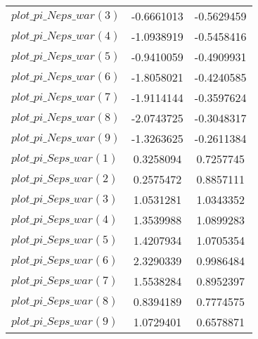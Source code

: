 \begin{center}
\begin{longtable}{lcc}
$plot\_pi\_N eps\_war (3)   $	 & 	     -0.6661013	 & 	     -0.5629459 \\ 
$plot\_pi\_N eps\_war (4)   $	 & 	     -1.0938919	 & 	     -0.5458416 \\ 
$plot\_pi\_N eps\_war (5)   $	 & 	     -0.9410059	 & 	     -0.4909931 \\ 
$plot\_pi\_N eps\_war (6)   $	 & 	     -1.8058021	 & 	     -0.4240585 \\ 
$plot\_pi\_N eps\_war (7)   $	 & 	     -1.9114144	 & 	     -0.3597624 \\ 
$plot\_pi\_N eps\_war (8)   $	 & 	     -2.0743725	 & 	     -0.3048317 \\ 
$plot\_pi\_N eps\_war (9)   $	 & 	     -1.3263625	 & 	     -0.2611384 \\ 
$plot\_pi\_S eps\_war (1)   $	 & 	      0.3258094	 & 	      0.7257745 \\ 
$plot\_pi\_S eps\_war (2)   $	 & 	      0.2575472	 & 	      0.8857111 \\ 
$plot\_pi\_S eps\_war (3)   $	 & 	      1.0531281	 & 	      1.0343352 \\ 
$plot\_pi\_S eps\_war (4)   $	 & 	      1.3539988	 & 	      1.0899283 \\ 
$plot\_pi\_S eps\_war (5)   $	 & 	      1.4207934	 & 	      1.0705354 \\ 
$plot\_pi\_S eps\_war (6)   $	 & 	      2.3290339	 & 	      0.9986484 \\ 
$plot\_pi\_S eps\_war (7)   $	 & 	      1.5538284	 & 	      0.8952397 \\ 
$plot\_pi\_S eps\_war (8)   $	 & 	      0.8394189	 & 	      0.7774575 \\ 
$plot\_pi\_S eps\_war (9)   $	 & 	      1.0729401	 & 	      0.6578871 \\ 
\end{longtable}
 \end{center}
